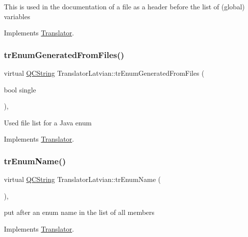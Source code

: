 This is used in the documentation of a file as a header before the list of (global) variables 

Implements \mbox{\hyperlink{class_translator}{Translator}}.

\mbox{\label{class_translator_latvian_a7882f7574de5adf1d4f549332e990877}} 
\subsubsection{\texorpdfstring{trEnumGeneratedFromFiles()}{trEnumGeneratedFromFiles()}}
{\footnotesize\ttfamily virtual \mbox{\hyperlink{class_q_c_string}{Q\+C\+String}} Translator\+Latvian\+::tr\+Enum\+Generated\+From\+Files (\begin{DoxyParamCaption}\item[{bool}]{single }\end{DoxyParamCaption})\hspace{0.3cm}{\ttfamily [inline]}, {\ttfamily [virtual]}}

Used file list for a Java enum 

Implements \mbox{\hyperlink{class_translator}{Translator}}.

\mbox{\label{class_translator_latvian_a1aec545d75fa37e696c0a3125b52f362}} 
\subsubsection{\texorpdfstring{trEnumName()}{trEnumName()}}
{\footnotesize\ttfamily virtual \mbox{\hyperlink{class_q_c_string}{Q\+C\+String}} Translator\+Latvian\+::tr\+Enum\+Name (\begin{DoxyParamCaption}{ }\end{DoxyParamCaption})\hspace{0.3cm}{\ttfamily [inline]}, {\ttfamily [virtual]}}

put after an enum name in the list of all members 

Implements \mbox{\hyperlink{class_translator}{Translator}}.

\mbox{\label{class_translator_latvian_a6b2d54d0692a25460379242348f2b640}} 
